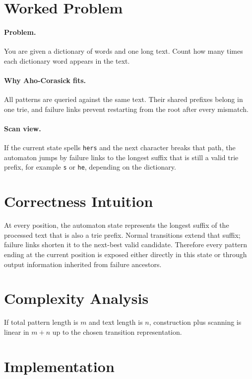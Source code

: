 \section*{Worked Problem}

\paragraph{Problem.}
You are given a dictionary of words and one long text. Count how many times each dictionary word appears in the text.

\paragraph{Why Aho-Corasick fits.}
All patterns are queried against the same text. Their shared prefixes belong in one trie, and failure links prevent
restarting from the root after every mismatch.

\paragraph{Scan view.}
If the current state spells \texttt{hers} and the next character breaks that path, the automaton jumps by failure links
to the longest suffix that is still a valid trie prefix, for example \texttt{s} or \texttt{he}, depending on the
dictionary.

\section*{Correctness Intuition}

At every position, the automaton state represents the longest suffix of the processed text that is also a trie prefix.
Normal transitions extend that suffix; failure links shorten it to the next-best valid candidate. Therefore every
pattern ending at the current position is exposed either directly in this state or through output information inherited
from failure ancestors.

\section*{Complexity Analysis}

If total pattern length is \(m\) and text length is \(n\), construction plus scanning is linear in \(m+n\) up to the
chosen transition representation.

\section*{Implementation}

